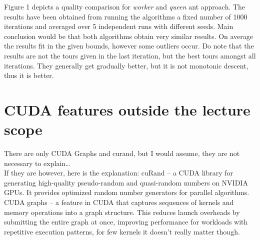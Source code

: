 \documentclass[12pt, a4paper]{article}
\begin{document}
Figure 1 depicts a quality comparison for \emph{worker} and \emph{queen} ant
approach. The results have been obtained from running the algorithms a fixed
number of 1000 iterations and averaged over 5 independent runs with different
seeds. Main conclusion would be that both algorithms obtain very similar
results. On average the results fit in the given bounds, however some outliers
occur. Do note that the results are not the tours given in the last iteration,
but the best tours amongst all iterations. They generally get gradually better,
but it is not monotonic descent, thus it is better.

\section*{CUDA features outside the lecture scope}

There are only CUDA Graphs and curand, but I would assume, they are not
necessary to explain…\\
If they are however, here is the explanation:
cuRand -- a CUDA library for generating high-quality pseudo-random and
quasi-random numbers on NVIDIA GPUs. It provides optimized random number
generators for parallel algorithms.\\
CUDA graphs -- a feature in CUDA that captures sequences of kernels and memory
operations into a graph structure. This reduces launch overheads by submitting
the entire graph at once, improving performance for workloads with repetitive
execution patterns, for few kernels it doesn't really matter though.
\end{document}
